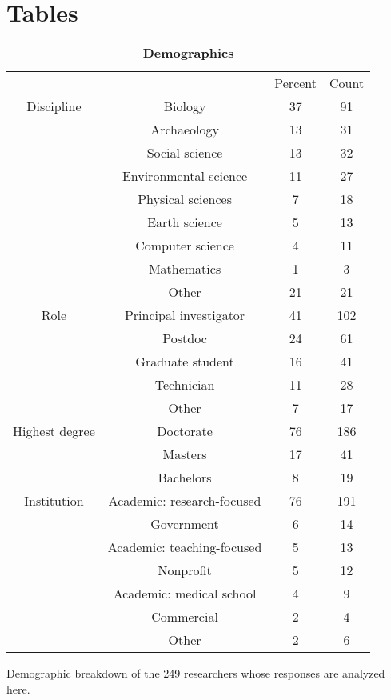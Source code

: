 \documentclass[10pt]{article}
\begin{document}
\section*{Tables}
\begin{table}[!ht]
\caption{
\bf{Demographics}}
\begin{tabular}{|c|c|c|c|}

 &  & Percent & Count \\
Discipline & Biology & 37 & 91 \\
 & Archaeology & 13 & 31 \\
 & Social science & 13 & 32 \\
 & Environmental science & 11 & 27 \\
 & Physical sciences & 7 & 18 \\
 & Earth science & 5 & 13 \\
 & Computer science & 4 & 11 \\
 & Mathematics & 1 & 3 \\
 & Other & 21 & 21 \\
Role & Principal investigator & 41 & 102 \\
 & Postdoc & 24 & 61 \\
 & Graduate student & 16 & 41 \\
 & Technician & 11 & 28 \\
 & Other & 7 & 17 \\
Highest degree & Doctorate & 76 & 186 \\
 & Masters & 17 & 41 \\
 & Bachelors & 8 & 19 \\
Institution & Academic: research-focused  & 76 & 191 \\
 & Government  & 6 & 14 \\
 & Academic: teaching-focused   & 5 & 13 \\
 & Nonprofit  & 5 & 12 \\
 & Academic: medical school   & 4 & 9 \\
 & Commercial  & 2 & 4 \\
 & Other  & 2 & 6 \\

\end{tabular}
\begin{flushleft}Demographic breakdown of the 249 researchers whose responses are analyzed here.
\end{flushleft}
\label{tab:demographics}
 \end{table}
\end{document}
